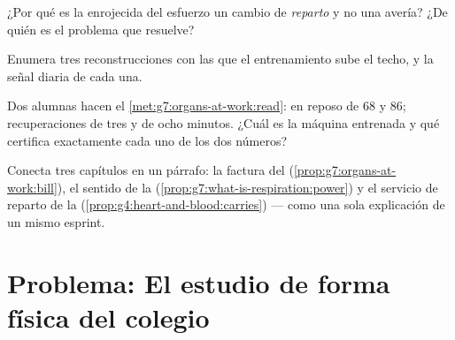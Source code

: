 \begin{exercise}[$\star\star$]\label{exo:g7:organs-at-work:9}
¿Por qué es la  enrojecida del esfuerzo un cambio de
\emph{reparto} y no una avería? ¿De quién es el problema que resuelve?
\end{exercise}

\begin{exercise}[$\star\star$]\label{exo:g7:organs-at-work:10}
Enumera tres reconstrucciones con las que el entrenamiento sube el
techo, y la señal diaria de cada una.
\end{exercise}

\begin{exercise}[$\star\star$]\label{exo:g7:organs-at-work:11}
Dos alumnas hacen el \cref{met:g7:organs-at-work:read}:  en
reposo de $68$ y $86$; recuperaciones de tres y de ocho minutos. ¿Cuál
es la máquina entrenada y qué certifica exactamente cada uno de los dos
números?
\end{exercise}

\begin{exercise}[$\star\star\star$]\label{exo:g7:organs-at-work:12}
Conecta tres capítulos en un párrafo: la factura del 
(\cref{prop:g7:organs-at-work:bill}), el sentido de la 
(\cref{prop:g7:what-is-respiration:power}) y el servicio de reparto de
la  (\cref{prop:g4:heart-and-blood:carries}) --- como una sola
explicación de un mismo esprint.
\end{exercise}

\section{Problema: El estudio de forma física del colegio}

